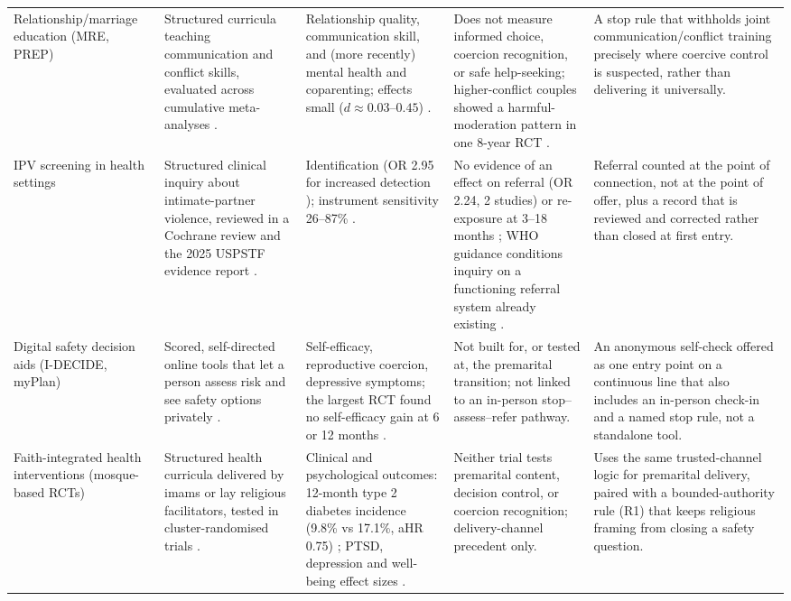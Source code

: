 \begin{table}[t]
\begin{tabularx}{\textwidth}{@{}p{2.1cm}YYYY@{}}
\addlinespace
Relationship\slash marriage education (MRE, PREP) & Structured curricula teaching communication and conflict skills, evaluated across cumulative meta-analyses \cite{ref6,ref7,fawcett2010}. & Relationship quality, communication skill, and (more recently) mental health and coparenting; effects small ($d\approx0.03$--$0.45$) \cite{ref6,ref7}. & Does not measure informed choice, coercion recognition, or safe help-seeking; higher-conflict couples showed a harmful-moderation pattern in one 8-year RCT \cite{ref9}. & A stop rule that withholds joint communication/conflict training precisely where coercive control is suspected, rather than delivering it universally.\\
\addlinespace
IPV screening in health settings & Structured clinical inquiry about intimate-partner violence, reviewed in a Cochrane review and the 2025 USPSTF evidence report \cite{ref38,ref39,ref40}. & Identification (OR 2.95 for increased detection \cite{ref38}); instrument sensitivity 26--87\% \cite{ref39}. & No evidence of an effect on referral (OR 2.24, 2 studies) or re-exposure at 3--18 months \cite{ref38,ref39}; WHO guidance conditions inquiry on a functioning referral system already existing \cite{ref43,ref44}. & Referral counted at the point of connection, not at the point of offer, plus a record that is reviewed and corrected rather than closed at first entry.\\
\addlinespace
Digital safety decision aids (I-DECIDE, myPlan) & Scored, self-directed online tools that let a person assess risk and see safety options privately \cite{ref119,ref120,ref123,ref124}. & Self-efficacy, reproductive coercion, depressive symptoms; the largest RCT found no self-efficacy gain at 6 or 12 months \cite{ref120}. & Not built for, or tested at, the premarital transition; not linked to an in-person stop--assess--refer pathway. & An anonymous self-check offered as one entry point on a continuous line that also includes an in-person check-in and a named stop rule, not a standalone tool.\\
\addlinespace
Faith-integrated health interventions (mosque-based RCTs) & Structured health curricula delivered by imams or lay religious facilitators, tested in cluster-randomised trials \cite{ref231,ref232}. & Clinical and psychological outcomes: 12-month type 2 diabetes incidence (9.8\% vs 17.1\%, aHR 0.75) \cite{ref231}; PTSD, depression and well-being effect sizes \cite{ref232}. & Neither trial tests premarital content, decision control, or coercion recognition; delivery-channel precedent only. & Uses the same trusted-channel logic for premarital delivery, paired with a bounded-authority rule (R1) that keeps religious framing from closing a safety question.\\
\bottomrule
\end{tabularx}
\end{table}

